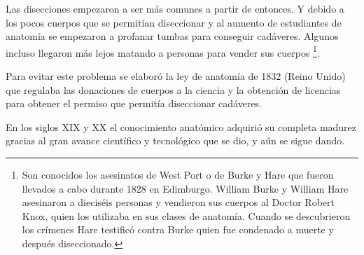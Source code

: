 Las disecciones empezaron a ser más comunes a partir de entonces. Y debido a los pocos cuerpos que se permitían diseccionar y al aumento de estudiantes de anatomía se empezaron a profanar tumbas para conseguir cadáveres. Algunos incluso llegaron más lejos matando a personas para vender sus cuerpos \footnote{Son conocidos los asesinatos de West Port o de Burke y Hare que fueron llevados a cabo durante 1828 en Edimburgo. William Burke y William Hare asesinaron a dieciséis personas y vendieron sus cuerpos al Doctor Robert Knox, quien los utilizaba en sus clases de anatomía. Cuando se descubrieron los crímenes Hare testificó contra Burke quien fue condenado a muerte y después diseccionado.}.

Para evitar este problema se elaboró la ley de anatomía de 1832 (Reino Unido) que regulaba las donaciones de cuerpos a la ciencia y la obtención de licencias para obtener el permiso que permitía diseccionar cadáveres.

En los siglos XIX y XX el conocimiento anatómico adquirió su completa madurez gracias al gran avance científico y tecnológico que se dio, y aún se sigue dando.





